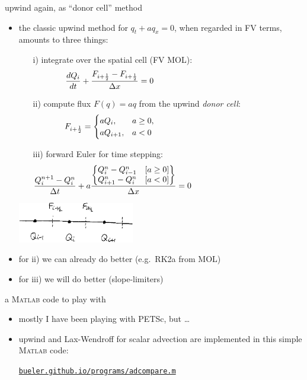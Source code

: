 \documentclass[10pt,hyperref,dvipsnames]{beamer}
\newcommand{\Matlab}{\textsc{Matlab}\xspace}
\newcommand{\Fiphalf}{{F_{i+\frac{1}{2}}}}
\begin{document}
\begin{frame}{upwind again, as ``donor cell'' method}

\begin{itemize}
\item the classic upwind method for $q_t + a q_x = 0$, when regarded in FV terms, amounts to three things:
    \begin{itemize}
    \item[i)] integrate over the spatial cell (FV MOL):
        $$\frac{dQ_i}{dt} + \frac{\Fiphalf-\Fiphalf}{\Delta x} = 0 \hspace{50mm}$$
    \item[ii)] compute flux $F(q)=aq$ from the upwind \emph{donor cell}:
        $$\Fiphalf = \begin{cases} a Q_{i}, & a \ge 0, \\
                                   a Q_{i+1}, & a < 0 \end{cases} \hspace{50mm}$$
    \item[iii)] forward Euler for time stepping:
        $$\frac{Q_i^{n+1} - Q_i^n}{\Delta t} + a \frac{\begin{Bmatrix} Q^n_{i}-Q^n_{i-1} \quad [a\ge 0] \\ Q^n_{i+1}-Q^n_{i} \quad [a<0] \end{Bmatrix}}{\Delta x} = 0 \hspace{50mm}$$
    \end{itemize}

\vspace{-30mm}

\hfill \includegraphics[width=0.4\textwidth]{figs/cellfluxsketch}

\vspace{12mm}
\item for ii) we can already do better (e.g.~RK2a from MOL)
\item for iii) we will do better (slope-limiters)
\end{itemize}
\end{frame}


\begin{frame}{a \Matlab code to play with}

\begin{itemize}
\item mostly I have been playing with PETSc, but \dots
\item upwind and Lax-Wendroff for scalar advection are implemented in this simple \Matlab code:

\begin{center}
\href{http://bueler.github.io/programs/adcompare.m}{\texttt{bueler.github.io/programs/adcompare.m}}
\end{center}
\end{itemize}
\end{frame}
\end{document}
